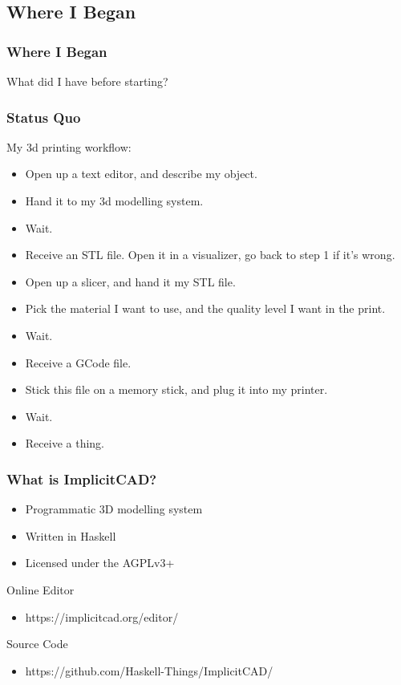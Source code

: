 \documentclass[hyperref={pdfpagemode=FullScreen},aspectratio=169]{beamer}
\begin{document}
\subsection{Where I Began}

\begin{frame}
  \frametitle{Where I Began}
  \Huge{\centerline{What did I have before starting?}}
\end{frame}

\begin{frame}
  \frametitle{Status Quo}
  My 3d printing workflow:
  \begin{itemize}
  \item Open up a text editor, and describe my object.
  \item Hand it to my 3d modelling system.
  \item Wait.
  \item Receive an STL file. Open it in a visualizer, go back to step 1 if it's wrong.
  \item Open up a slicer, and hand it my STL file.
  \item Pick the material I want to use, and the quality level I want in the print.
  \item Wait.
  \item Receive a GCode file.
  \item Stick this file on a memory stick, and plug it into my printer.
  \item Wait.
  \item Receive a thing.
  \end{itemize}
\end{frame}

\begin{frame}
  \frametitle{What is ImplicitCAD?}
  \begin{itemize}
  \item Programmatic 3D modelling system
  \item Written in Haskell
  \item Licensed under the AGPLv3+
  \end{itemize}
  \begin{block}{Online Editor}
    \begin{itemize}
    \item https://implicitcad.org/editor/
    \end{itemize}
  \end{block}
  \begin{block}{Source Code}
    \begin{itemize}
    \item https://github.com/Haskell-Things/ImplicitCAD/
    \end{itemize}
  \end{block}
\end{frame}
\end{document}
